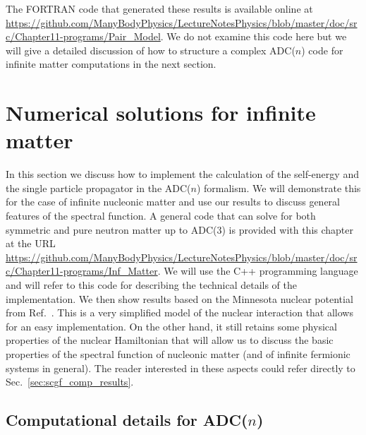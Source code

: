 The FORTRAN code that generated these results is available online at  {\sloppy  \url{https://github.com/ManyBodyPhysics/LectureNotesPhysics/blob/master/doc/src/Chapter11-programs/Pair_Model}}. We do not examine this code here but we will give a detailed discussion of how to structure a complex ADC($n$) code for infinite matter computations in the next section.


\section{Numerical solutions for infinite matter}
\label{sec:scgf_comp}


In this section we discuss how to implement the calculation of the self-energy and the single particle propagator
in the ADC($n$) formalism. We will demonstrate this for the case of infinite nucleonic matter and use our
results to discuss  general  features of the spectral function.
%
A general code that can solve for both symmetric and pure neutron matter up to ADC(3)
is provided with  this chapter at the {\sloppy
URL  \url{https://github.com/ManyBodyPhysics/LectureNotesPhysics/blob/master/doc/src/Chapter11-programs/Inf_Matter}. } 
We will
use the  C++ programming language and will refer to this code for describing the technical details of the implementation.
%
We then show results based on the Minnesota nuclear potential from Ref.~\cite{ch11_minnesota}. This is a very simplified model of the nuclear 
interaction that allows for an easy implementation. On the other hand, it still retains some physical properties of
 the nuclear Hamiltonian that will allow us to discuss the basic properties of the spectral function
of  nucleonic matter (and of infinite fermionic systems in general).  The reader interested in these  aspects could refer directly
to Sec.~\ref{sec:scgf_comp_results}.



\subsection{Computational details for \texorpdfstring{ADC($n$)}{ADC(n)}}
\label{sec:scgf_comp_code}

